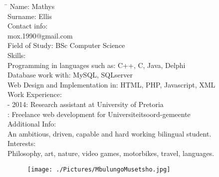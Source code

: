 \documentclass[12pt]{article}
\begin{document}
	\begin{tabbing}
		\hspace*{3.5cm}\=\hspace*{3cm} \kill
		Name:	\>	Mathys \\
		Surname:	\>	Ellis \\
		Contact info:	 \\
			\>	mox.1990@gmail.com \\
		Field of Study:	\> BSc Computer Science \\
		Skills:	\\
			\>	Programming in languages such as: C++, C, Java, Delphi \\
			\>	Database work with: MySQL, SQLserver \\
			\>	Web Design and Implementation in: HTML, PHP, Javascript, XML \\
		Work Experience: \\
			 - 2014: Research assistant at University of Pretoria \\
			: Freelance web development for Universiteitsoord-gemeente \\
		Additional Info: \\
		\> An ambitious, driven, capable and hard working bilingual student. \\
		Interests: \\
		\> Philosophy, art, nature, video games, motorbikes, travel, languages. \\
	\end{tabbing}


	\newpage
	\begin{figure}[ht!]
		\centering
		\texttt{[image: ./Pictures/MbulungoMusetsho.jpg]}
	\end{figure}
	
\end{document}
